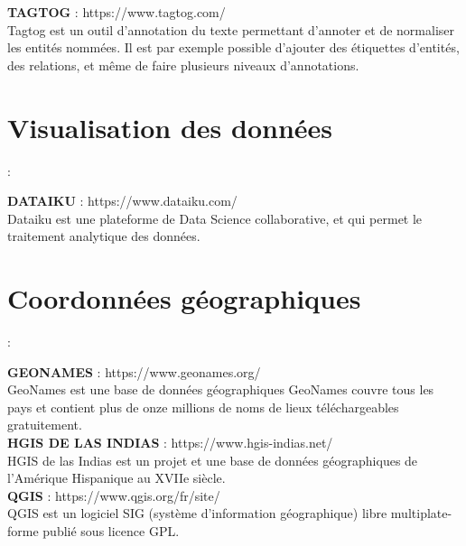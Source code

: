 \documentclass[a4paper,12pt,twoside]{book}
\begin{document}
	\noindent \textbf{TAGTOG} : https://www.tagtog.com/ \\
	
	Tagtog est un outil d’annotation du texte permettant d’annoter et de normaliser les entités nommées. Il est par exemple possible d’ajouter des étiquettes d’entités, des relations, et même de faire plusieurs niveaux d’annotations.
	
	

	\section{Visualisation des données} : 
	
	\noindent \textbf{DATAIKU} : https://www.dataiku.com/ \\
	
	Dataiku est une plateforme de Data Science collaborative, et qui permet le traitement analytique des données.
	
	\section{Coordonnées géographiques} : 
	
	\noindent \textbf{GEONAMES} : https://www.geonames.org/ \\
	
	GeoNames est une base de données géographiques GeoNames couvre tous les pays et contient plus de onze millions de noms de lieux téléchargeables gratuitement. \\
	
	\noindent \textbf{HGIS DE LAS INDIAS} : https://www.hgis-indias.net/ \\
	
	HGIS de las Indias est un projet et une base de données géographiques de l'Amérique Hispanique au XVIIe siècle. \\
	
	\noindent \textbf{QGIS} : https://www.qgis.org/fr/site/ \\
	
	QGIS est un logiciel SIG (système d'information géographique) libre multiplate-forme publié sous licence GPL. 
	
\printglossary[type=\acronymtype]

    \backmatter
    \printbibliography
	
    \listoffigures	






	\tableofcontents
	
\end{document}
